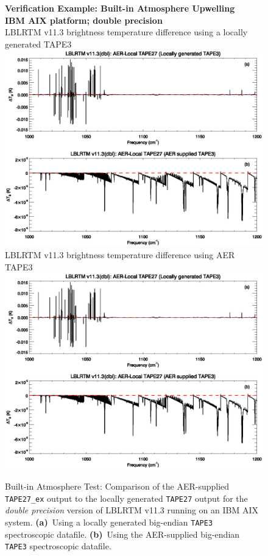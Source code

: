 \begin{figure}[htp]
  \centering
  \qquad\sffamily\textbf{Verification Example: Built-in Atmosphere Upwelling}\\
  \qquad\sffamily\textbf{IBM AIX platform; double precision}\\
  \qquad\textsf{LBLRTM v11.3 brightness temperature difference using a locally generated TAPE3}\\
  \includegraphics[bb=85 403 534 558,clip,scale=1.0]{graphics/run_example_built_in_atm_upwelling/dbl_ibm.eps}
  \qquad\textsf{LBLRTM v11.3 brightness temperature difference using AER TAPE3}\\
  \includegraphics[bb=85 226 534 381,clip,scale=1.0]{graphics/run_example_built_in_atm_upwelling/dbl_ibm.eps}
  \caption{Built-in Atmosphere Test: Comparison of the AER-supplied \texttt{TAPE27\_ex} output to the locally generated \texttt{TAPE27} output for the \textsl{double precision} version of LBLRTM v11.3 running on an IBM AIX system. \mbox{\textbf{(a)} Using} a locally generated big-endian \texttt{TAPE3} spectroscopic datafile. \mbox{\textbf{(b)} Using} the AER-supplied big-endian \texttt{TAPE3} spectroscopic datafile.}
  \label{fig:run_example_built_in_atm_upwelling-dbl_ibm}
\end{figure}

